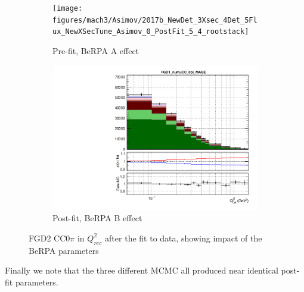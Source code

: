 \begin{figure}[h]
	\begin{subfigure}[t]{0.49\textwidth}
		\texttt{[image: figures/mach3/Asimov/2017b\_NewDet\_3Xsec\_4Det\_5Flux\_NewXSecTune\_Asimov\_0\_PostFit\_5\_4\_rootstack]}
		\caption{Pre-fit, BeRPA A effect}
	\end{subfigure}
	\begin{subfigure}[t]{0.49\textwidth}
		\includegraphics[width=\textwidth, trim={0mm 0mm 0mm 6mm}, clip,page=127]{figures/mach3/data/postfit/2017b_NewData_NewDet_UpdXsecStep_2Xsec_4Det_5Flux_0_PostFit_5_4_rootstack}
		\caption{Post-fit, BeRPA B effect}
	\end{subfigure}
	\caption{FGD2 CC$0\pi$ in $Q^2_{rec}$ after the fit to data, showing impact of the BeRPA parameters}
	\label{fig:fgd2_cc0pi_q2_berpa}
\end{figure}

Finally we note that the three different MCMC all produced near identical post-fit parameters.

